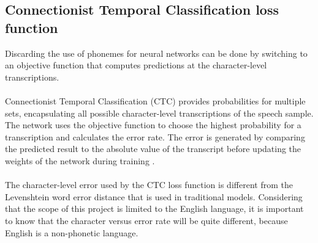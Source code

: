 \subsection{Connectionist Temporal Classification loss function}
 Discarding the use of phonemes for neural networks can be done by switching to an
 objective function that computes predictions at the character-level transcriptions.\\\\
Connectionist Temporal Classification (CTC) provides probabilities for multiple sets, encapsulating all possible character-level transcriptions of the speech sample.
The network uses the objective function to choose the highest probability for a transcription and calculates the error rate. The error is generated by comparing the
predicted result to the absolute value of the transcript before updating the weights of the network during training \cite{Great}.\\\\
The character-level error used by the CTC loss function is different from the Levenshtein \cite{stratonovich1960conditional} word error distance that is used in traditional models. Considering that the scope of this project is limited to the English language, it is important to know
that the character versus error rate will be quite different, because English is a
non-phonetic language.
